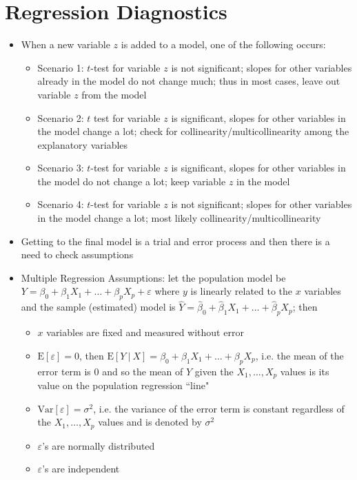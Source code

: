 \documentclass[12pt]{article}
\begin{document}
\section{Regression Diagnostics}
\begin{itemize}
\item When a new variable $z$ is added to a model, one of the following occurs: \begin{itemize} 
\item Scenario 1: $t$-test for variable $z$ is not significant; slopes for other variables already in the model do not change much; thus in most cases, leave out variable $z$ from the model
\item Scenario 2: $t$ test for variable $z$ is significant, slopes for other variables in the model change a lot; check for collinearity/multicollinearity among the explanatory variables 
\item Scenario 3: $t$-test for variable $z$ is significant, slopes for other variables in the model do not change a lot; keep variable $z$ in the model
\item Scenario 4: $t$-test for variable $z$ is not significant; slopes for other variables in the model change a lot; most likely collinearity/multicollinearity \end{itemize} 
\item Getting to the final model is a trial and error process and then there is a need to check assumptions 
\item Multiple Regression Assumptions: let the population model be $Y = \beta_0 + \beta_1X_1 + \dots + \beta_pX_p + \varepsilon$ where $y$ is linearly related to the $x$ variables and the sample (estimated) model is $\hat{Y} = \hat{\beta}_0 + \hat{\beta}_1X_1 + \dots + \hat{\beta}_pX_p$; then \begin{itemize}
\item $x$ variables are fixed and measured without error
\item $\text{E}[\varepsilon] = 0$, then $\text{E}[Y~|~X] = \beta_0 + \beta_1X_1 + \dots + \beta_pX_p$, i.e. the mean of the error term is $0$ and so the mean of $Y$ given the $X_1,\dots,X_p$ values is its value on the population regression ``line" 
\item $\text{Var}[\varepsilon] = \sigma^2$, i.e. the variance of the error term is constant regardless of the $X_1,\dots,X_p$ values and is denoted by $\sigma^2$ 
\item $\varepsilon$'s are normally distributed 
\item $\varepsilon$'s are independent 

\end{itemize}
\end{itemize}
\end{document}
